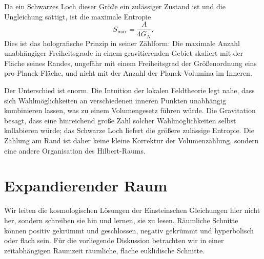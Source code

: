 Da ein Schwarzes Loch dieser Größe ein zulässiger Zustand ist und die Ungleichung sättigt, ist die maximale Entropie
\begin{equation}
S_{\max}=\frac{A}{4G_N}.
\label{eq:l07-holographic-maximum}
\end{equation}
Dies ist das holografische Prinzip in seiner Zählform: Die maximale Anzahl unabhängiger Freiheitsgrade in einem gravitierenden Gebiet skaliert mit der Fläche seines Randes, ungefähr mit einem Freiheitsgrad der Größenordnung eins pro Planck-Fläche, und nicht mit der Anzahl der Planck-Volumina im Inneren.

Der Unterschied ist enorm. Die Intuition der lokalen Feldtheorie legt nahe, dass sich Wahlmöglichkeiten an verschiedenen inneren Punkten unabhängig kombinieren lassen, was zu einem Volumengesetz führen würde. Die Gravitation besagt, dass eine hinreichend große Zahl solcher Wahlmöglichkeiten selbst kollabieren würde; das Schwarze Loch liefert die größere zulässige Entropie. Die Zählung am Rand ist daher keine kleine Korrektur der Volumenzählung, sondern eine andere Organisation des Hilbert-Raums.

\begin{classroomqa}
\end{classroomqa}

\begin{classroomqa}
\end{classroomqa}

\section{Expandierender Raum}

Wir leiten die kosmologischen Lösungen der Einsteinschen Gleichungen hier nicht her, sondern schreiben sie hin und lernen, sie zu lesen. Räumliche Schnitte können positiv gekrümmt und geschlossen, negativ gekrümmt und hyperbolisch oder flach sein. Für die vorliegende Diskussion betrachten wir in einer zeitabhängigen Raumzeit räumliche, flache euklidische Schnitte.

